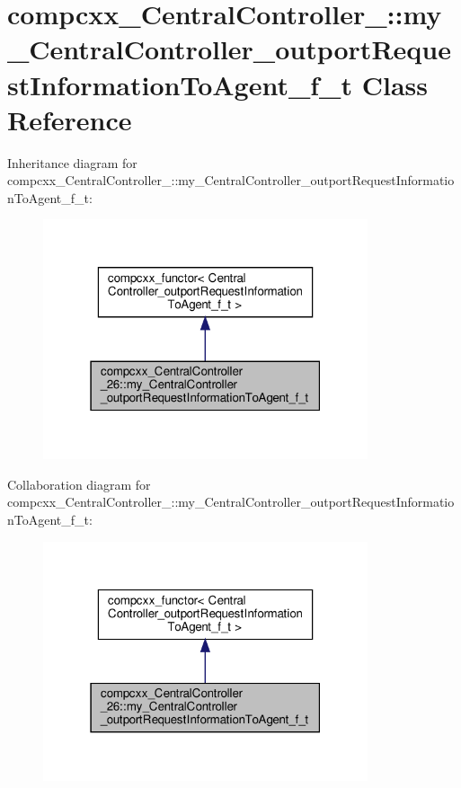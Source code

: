 \hypertarget{classcompcxx__CentralController__26_1_1my__CentralController__outportRequestInformationToAgent__f__t}{}\section{compcxx\+\_\+\+Central\+Controller\+\_\+:\+:my\+\_\+\+Central\+Controller\+\_\+outport\+Request\+Information\+To\+Agent\+\_\+f\+\_\+t Class Reference}
\label{classcompcxx__CentralController__26_1_1my__CentralController__outportRequestInformationToAgent__f__t}


Inheritance diagram for compcxx\+\_\+\+Central\+Controller\+\_\+:\+:my\+\_\+\+Central\+Controller\+\_\+outport\+Request\+Information\+To\+Agent\+\_\+f\+\_\+t\+:\nopagebreak
\begin{figure}[H]
\begin{center}
\leavevmode
\includegraphics[width=271pt]{classcompcxx__CentralController__26_1_1my__CentralController__outportRequestInformationToAgent__f__t__inherit__graph}
\end{center}
\end{figure}


Collaboration diagram for compcxx\+\_\+\+Central\+Controller\+\_\+:\+:my\+\_\+\+Central\+Controller\+\_\+outport\+Request\+Information\+To\+Agent\+\_\+f\+\_\+t\+:\nopagebreak
\begin{figure}[H]
\begin{center}
\leavevmode
\includegraphics[width=271pt]{classcompcxx__CentralController__26_1_1my__CentralController__outportRequestInformationToAgent__f__t__coll__graph}
\end{center}
\end{figure}
